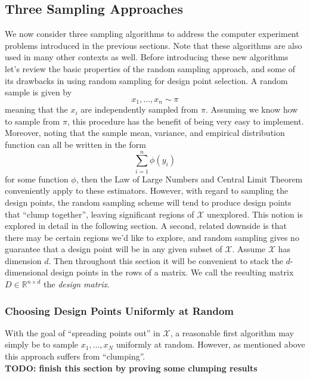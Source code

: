 \documentclass[12pt]{article}
\newcommand{\R}{\mathcal{R}}
\def\R{\mathbb{R}}
\begin{document}
\subsection{Three Sampling Approaches}
We now consider three sampling algorithms to address the computer experiment problems introduced in the previous sections. Note that these algorithms
are also used in many other contexts as well. Before introducing these new algorithms let's review the basic properties of the random sampling approach, 
and some of its drawbacks in using random sampling for design point selection. A random sample is given by 
\[x_1, \dots, x_n \sim \pi\]
meaning that the $x_i$ are independently sampled from $\pi$. Assuming we know how to sample from $\pi$, this procedure has the benefit of being 
very easy to implement. Moreover, noting that the sample mean, variance, and empirical distribution function can all be written in the form
\[\sum_{i = 1}^{n} \phi(y_i)\]
for some function $\phi$, then the Law of Large Numbers and Central Limit Theorem conveniently apply to these estimators. However, with regard to 
sampling the design points, the random sampling scheme will tend to produce design points that ``clump together'', leaving significant regions 
of $\mathcal{X}$ unexplored. This notion is explored in detail in the following section. A second, related downside is that there may be certain 
regions we'd like to explore, and random sampling gives no guarantee that a design point will be in any given subset of $\mathcal{X}$. 
Assume $\mathcal{X}$ has dimension $d$. Then throughout this section it will be convenient to stack the $d$-dimensional design points in the rows 
of a matrix. We call the resulting matrix $D \in \R^{n \times d}$ the \textit{design matrix}. 

\subsubsection{Choosing Design Points Uniformly at Random}
With the goal of ``spreading points out'' in $\mathcal{X}$, a reasonable first algorithm may simply be to sample $x_1, \dots, x_N$
uniformly at random. However, as mentioned above this approach suffers from ``clumping''. \\[.2cm]
\textbf{TODO: finish this section by proving some clumping results}
\end{document}
